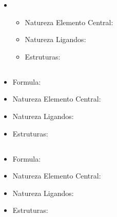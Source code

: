 \documentclass[12pt]{article}
\begin{document}
\begin{itemize}
	
	\item \ch{  }
	
	\begin{itemize}
 		
		\item Natureza Elemento Central:
	
		\item Natureza Ligandos:
	
		\item Estruturas:
		
	\end{itemize}



%	
% 		
%	
%	
%		



\end{itemize}



\subsection{}
\begin{itemize}

	\item Formula: \ch{  }
	
	\item Natureza Elemento Central:
	
	\item Natureza Ligandos:
	
	\item Estruturas:

\end{itemize}



\subsection{}
\begin{itemize}

	\item Formula: \ch{  }
	
	\item Natureza Elemento Central:
	
	\item Natureza Ligandos:
	
	\item Estruturas:

\end{itemize}
\end{document}
